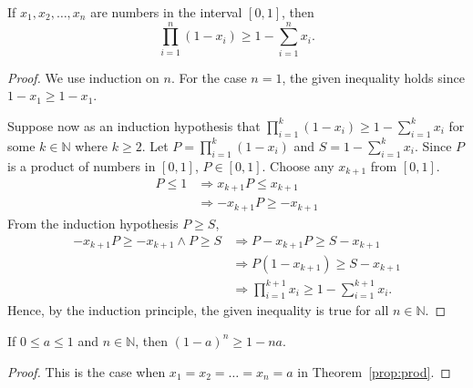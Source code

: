 \documentclass[../main.tex]{subfiles}
\begin{document}
\begin{prop} \label{prop:prod}
    If $x_1, x_2, \dots, x_n$ are numbers in the interval $[0, 1]$, then
    \[
        \prod_{i = 1}^{n} (1 - x_i) \geq 1 - \sum_{i = 1}^n x_i.
    \]
\end{prop}
\begin{proof}
    We use induction on $n$.
    For the case $n = 1$, the given inequality holds since $1 - x_1 \geq 1- x_1$.

    Suppose now as an induction hypothesis that $\prod_{i = 1}^k (1 - x_i) \geq 1 - \sum_{i = 1}^k x_i$ for some $k \in \mathbb N$ where $k \geq 2$.
    Let $P = \prod_{i = 1}^k (1 - x_i)$ and $S = 1 - \sum_{i = 1}^k x_i$.
    Since $P$ is a product of numbers in $[0, 1]$, $P \in [0, 1]$.
    Choose any $x_{k+1}$ from $[0, 1]$.
    \begin{align*}
        P \leq 1 &\Rightarrow x_{k+1} P \leq x_{k+1}\\
                 &\Rightarrow -x_{k+1} P \geq -x_{k+1}
    \end{align*}
    From the induction hypothesis $P \geq S$,
    \begin{align*}
        -x_{k+1} P \geq -x_{k+1} \wedge P \geq S &\Rightarrow P - x_{k+1} P \geq S - x_{k+1}\\
                                                 &\Rightarrow P(1 - x_{k+1}) \geq S - x_{k+1}\\
                                                 &\Rightarrow \prod_{i = 1}^{k+1} x_i \geq 1 - \sum_{i = 1}^{k+1} x_i.
    \end{align*}
    Hence, by the induction principle, the given inequality is true for all $n \in \mathbb N$.
\end{proof}

\begin{cor}
    If $0 \leq a \leq 1$ and $n \in \mathbb N$, then $(1 - a)^n \geq 1 - na$.
\end{cor}
\begin{proof}
    This is the case when $x_1 = x_2 = \dots = x_n = a$ in Theorem~\ref{prop:prod}.
\end{proof}
\end{document}
